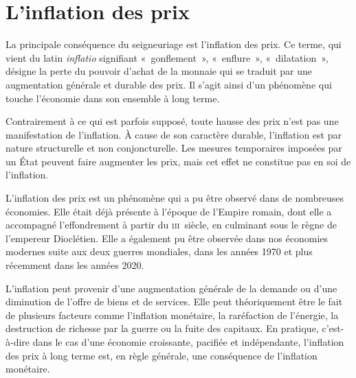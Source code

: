 
\section*{L'inflation des prix}

La principale conséquence du seigneuriage est l'inflation des prix. Ce terme, qui vient du latin \emph{inflatio} signifiant «~gonflement~», «~enflure~», «~dilatation~», désigne la perte du pouvoir d'achat de la monnaie qui se traduit par une augmentation générale et durable des prix. Il s'agit ainsi d'un phénomène qui touche l'économie dans son ensemble à long terme.


Contrairement à ce qui est parfois supposé, toute hausse des prix n'est pas une manifestation de l'inflation. À cause de son caractère durable, l'inflation est par nature structurelle et non conjoncturelle. Les mesures temporaires imposées par un État peuvent faire augmenter les prix, mais cet effet ne constitue pas en soi de l'inflation.

L'inflation des prix est un phénomène qui a pu être observé dans de nombreuses économies. Elle était déjà présente à l'époque de l'Empire romain, dont elle a accompagné l'effondrement à partir du \textsc{iii}\ieme{}~siècle, en culminant sous le règne de l'empereur Dioclétien. Elle a également pu être observée dans nos économies modernes suite aux deux guerres mondiales, dans les années 1970 et plus récemment dans les années 2020.

L'inflation peut provenir d'une augmentation générale de la demande ou d'une diminution de l'offre de biens et de services. Elle peut théoriquement être le fait de plusieurs facteurs comme l'inflation monétaire, la raréfaction de l'énergie, la destruction de richesse par la guerre ou la fuite des capitaux. En pratique, c'est-à-dire dans le cas d'une économie croissante, pacifiée et indépendante, l'inflation des prix à long terme est, en règle générale, une conséquence de l'inflation monétaire. %

